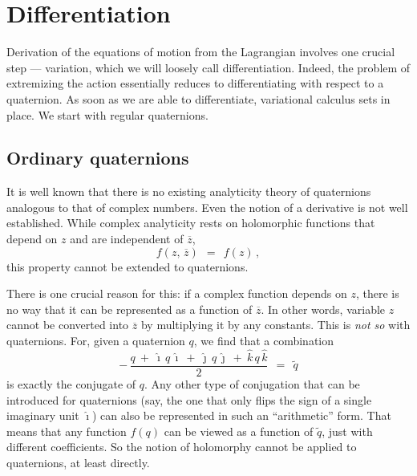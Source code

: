 \documentclass[epsfig,12pt]{article}
\newcommand{\wt}{\widetilde}
\newcommand{\ov}{\overline}
\newcommand{\ii}{\hat\imath}
\newcommand{\jj}{\hat\jmath}
\newcommand{\kk}{\hat k}
\begin{document}
\section{Differentiation}
\label{section-diff}

	Derivation of the equations of motion from the Lagrangian involves one
	crucial step --- variation, which we will loosely call differentiation.
	Indeed, the problem of extremizing the action essentially reduces
	to differentiating with respect to a quaternion.
	As soon as we are able to differentiate, variational calculus sets in place.
	We start with regular quaternions.


\subsection{Ordinary quaternions}
\label{sec-ordinary-quat}

	It is well known that there is no existing analyticity theory of quaternions
	analogous to that of complex numbers.
	Even the notion of a derivative is not well established.
	While complex analyticity rests on holomorphic functions that depend on $ z $ and
	are independent of $ \ov z $,
\[
	f(z,\, \ov z)	~~=~~	f(z)\,,
\]
	this property cannot be extended to quaternions.

	There is one crucial reason for this: if a complex function depends on $ z $, there is no
	way that it can be represented as a function of $ \ov z $.
	In other words, variable $ z $ cannot be converted into $ \ov z $ by
	multiplying it by any constants.
	This is \emph{not so} with quaternions.
	For, given a quaternion $ q $, we find that a combination
\begin{equation}
	-\, \frac{ q  ~+~  \ii\,q\,\ii  ~+~  \jj\,q\,\jj  ~+~  \kk\,q\,\kk } 2
	~~=~~
	\wt q
\end{equation}
	is exactly the conjugate of $ q $.
	Any other type of conjugation that can be introduced for quaternions (say, the one that
	only flips the sign of a single imaginary unit $ \ii $) can also be represented in such
	an ``arithmetic'' form.
	That means that any function $ f(q) $ can be viewed as a function of $ \wt q $, just
	with different coefficients.
	So the notion of holomorphy cannot be applied to quaternions, at least directly.
\end{document}
